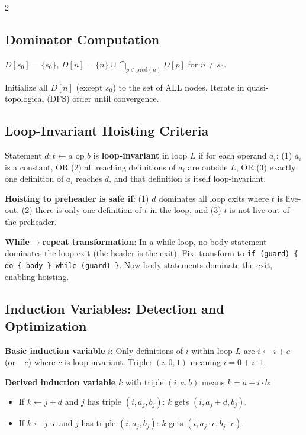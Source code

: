 \documentclass[9pt,landscape]{extarticle}
\begin{document}
\begin{multicols}{2}
\subsection{Dominator Computation}

$D[s_0] = \{s_0\}$, \quad $D[n] = \{n\} \cup \bigcap_{p \in \text{pred}(n)} D[p]$ for $n \neq s_0$.

Initialize all $D[n]$ (except $s_0$) to the set of ALL nodes. Iterate in quasi-topological (DFS) order until convergence.

\subsection{Loop-Invariant Hoisting Criteria}

Statement $d: t \leftarrow a$ op $b$ is \textbf{loop-invariant} in loop $L$ if for each operand $a_i$: (1) $a_i$ is a constant, OR (2) all reaching definitions of $a_i$ are outside $L$, OR (3) exactly one definition of $a_i$ reaches $d$, and that definition is itself loop-invariant.

\textbf{Hoisting to preheader is safe if}: (1) $d$ dominates all loop exits where $t$ is live-out, (2) there is only one definition of $t$ in the loop, and (3) $t$ is not live-out of the preheader.

\textbf{While$\to$repeat transformation}: In a while-loop, no body statement dominates the loop exit (the header is the exit). Fix: transform to \texttt{if (guard) \{ do \{ body \} while (guard) \}}. Now body statements dominate the exit, enabling hoisting.

\subsection{Induction Variables: Detection and Optimization}

\textbf{Basic induction variable} $i$: Only definitions of $i$ within loop $L$ are $i \leftarrow i + c$ (or $- c$) where $c$ is loop-invariant. Triple: $(i, 0, 1)$ meaning $i = 0 + i \cdot 1$.

\textbf{Derived induction variable} $k$ with triple $(i, a, b)$ means $k = a + i \cdot b$:
\begin{itemize}
  \item If $k \leftarrow j + d$ and $j$ has triple $(i, a_j, b_j)$: $k$ gets $(i, a_j + d, b_j)$.
  \item If $k \leftarrow j \cdot c$ and $j$ has triple $(i, a_j, b_j)$: $k$ gets $(i, a_j \cdot c, b_j \cdot c)$.
\end{itemize}


\end{multicols}
\end{document}
